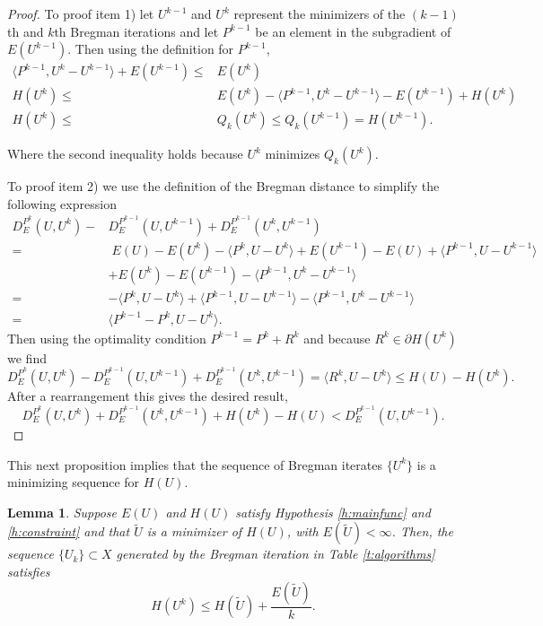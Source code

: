 \documentclass[11pt]{article}
\theoremstyle{plain}
\newtheorem{Lemma}{Lemma}[section]
\begin{document}
\begin{proof}

To proof item 1) let $U^{k-1}$ and $U^k$ represent the minimizers of the $(k-1)$th and $k$th Bregman iterations and let $P^{k-1}$ be an element in the subgradient of $E(U^{k-1})$. Then using the definition for $P^{k-1}$,
\begin{align*}
 \langle P^{k-1} , U^k - U^{k-1} \rangle +E(U^{k-1})  \leq &   E(U^k) \\
 H(U^k) \leq  & E(U^k) - \langle P^{k-1} , U^k - U^{k-1} \rangle - E(U^{k-1})   + H(U^k)\\
 H(U^k) \leq &Q_k(U^k)  \leq Q_k(U^{k-1}) = H(U^{k-1}).
 \end{align*}
 
Where the second inequality holds because $U^k$ minimizes $Q_k(U^k)$.

To proof item 2) we use the definition of the Bregman distance to simplify the following expression
\begin{align*}
 D^{P^k}_E(U, U^k) -& D^{P^{k-1}}_E(U,U^{k-1}) + D^{P^{k-1}}_E(U^k,U^{k-1})  \\
 =& \; E(U) -E(U^k) - \langle P^k, U-U^k \rangle  + E(U^{k-1}) - E(U)  + \langle P^{k-1}, U-U^{k-1} \rangle \\
 & +  E(U^k) -E(U^{k-1}) - \langle P^{k-1}, U^k-U^{k-1} \rangle\\
  = & - \langle P^k, U-U^k \rangle + \langle P^{k-1}, U-U^{k-1} \rangle - \langle P^{k-1}, U^k-U^{k-1} \rangle\\
  =&  \langle P^{k-1}- P^k, U-U^k \rangle.
\end{align*}
Then using the optimality condition $P^{k-1} = P^k +R^k$ and because $R^k \in \partial H(U^k)$  we find
\[  D^{P^k}_E(U, U^k) - D^{P^{k-1}}_E(U,U^{k-1}) + D^{P^{k-1}}_E(U^k,U^{k-1})    =  \langle R^k, U-U^k \rangle \leq H(U) - H(U^k). \]
After a rearrangement this gives the desired result,
\[ D^{P^k}_E( U,U^k) + D^{P^{k-1}}_E(U^k,U^{k-1})+H(U^k)-H(U)< D^{P^{k-1}}_E(U,U^{k-1}). \]

\end{proof}

 This next proposition implies that the sequence of Bregman iterates $\{U^k\}$ is a minimizing sequence for $H(U)$.


\begin{Lemma}\label{l:minimizing}
Suppose $E(U)$ and $H(U)$ satisfy Hypothesis \ref{h:mainfunc} and \ref{h:constraint} and that $\tilde{U}$ is a minimizer of $H(U)$, with $E(\tilde{U})<\infty$. Then, the sequence $\{U_k\} \subset X$ generated by the Bregman iteration in Table \ref{t:algorithms} satisfies $$H(U^k) \leq H(\tilde{U}) + \frac{E(\tilde{U})}{k}.$$
\end{Lemma}
\end{document}
